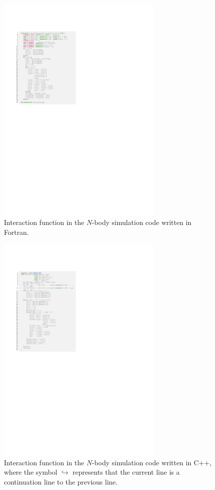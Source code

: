 \documentclass[proof,useamsfonts]{pasj01}
\begin{document}
\begin{figure}[h]
\begin{center}
\includegraphics[width=8cm]{figures/src_ftn_nbody_kernel}
\end{center}
\caption{Interaction function in the $N$-body simulation code written in Fortran.}
\label{fig:src_ftn_nbody_kernel}  
\end{figure}



\begin{figure}[h]
\begin{center}
\includegraphics[width=8cm]{figures/src_cpp_nbody_kernel}
\end{center}
\caption{Interaction function in the $N$-body simulation code written in C++, where the symbol $\hookrightarrow$ represents that the current line is a continuation line to the previous line.}
\label{fig:src_cpp_nbody_kernel}  
\end{figure}
\end{document}
